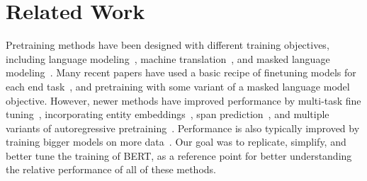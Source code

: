 \section{Related Work} \label{sec:relwork}

Pretraining methods have been designed with different training objectives, including language modeling~\cite{dai2015semi,peters2018deep,howard2018universal},  machine translation~\cite{mccann2017learned}, and masked language modeling~\cite{devlin2018bert,lample2019cross}. Many recent papers have used a basic recipe of  finetuning models for each end task~\cite{howard2018universal,radford2018gpt}, and pretraining with some variant of a masked language model objective.  However, newer methods have improved performance by multi-task fine tuning~\cite{dong2019unified}, incorporating entity embeddings~\cite{sun2019ernie}, span prediction~\cite{joshi2019spanbert}, and multiple variants of autoregressive pretraining~\cite{song2019mass,chan2019kermit,yang2019xlnet}.  Performance is also typically improved by training bigger models on more data~\cite{devlin2018bert,baevski2019cloze,yang2019xlnet,radford2019language}. Our goal was to replicate, simplify, and better tune the training of BERT, as a reference point for better understanding the relative performance of all of these methods. 

